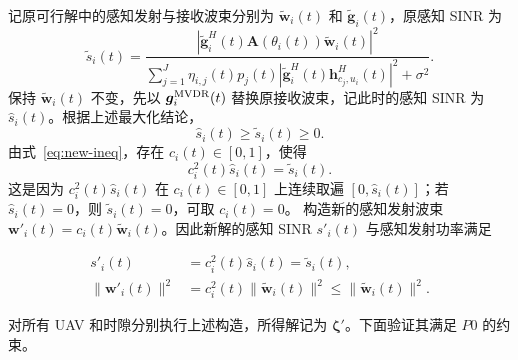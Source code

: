 \documentclass[11pt,a4paper]{ctexart}
\begin{document}
记原可行解中的感知发射与接收波束分别为 $\tilde{\bm w}_i(t)$ 和 $\tilde{\bm g}_i(t)$，原感知 SINR 为
\begin{equation}\label{eq:new-old-sinr}
\tilde s_i(t)=\frac{\left|\tilde{\bm g}_i^H(t)\mathbf A(\theta_i(t))\tilde{\bm w}_i(t)\right|^2}{\displaystyle\sum_{j=1}^{J}\eta_{i,j}(t)p_j(t)\left|\tilde{\bm g}_i^H(t)\bm h_{c_j,u_i}^{H}(t)\right|^2+\sigma^2}.
\end{equation}
保持 $\tilde{\bm w}_i(t)$ 不变，先以 $\bm g_i^{\rm MVDR}(t)$ 替换原接收波束，记此时的感知 SINR 为 $\hat s_i(t)$。根据上述最大化结论，
\begin{equation}\label{eq:new-ineq}
\hat s_i(t)\ge\tilde s_i(t)\ge0.
\end{equation}
由式~\eqref{eq:new-ineq}，存在 $c_i(t)\in[0,1]$，使得
\begin{equation}\label{eq:new-scale}
c_i^2(t)\hat s_i(t)=\tilde s_i(t).
\end{equation}
这是因为 $c_i^2(t)\hat s_i(t)$ 在 $c_i(t)\in[0,1]$ 上连续取遍 $[0,\hat s_i(t)]$；若 $\hat s_i(t)=0$，则 $\tilde s_i(t)=0$，可取 $c_i(t)=0$。
构造新的感知发射波束 $\bm w'_i(t)=c_i(t)\tilde{\bm w}_i(t)$。因此新解的感知 SINR $s'_i(t)$ 与感知发射功率满足
\begin{samepage}
\begin{align}\label{eq:new-same-sinr}
s'_i(t)&=c_i^2(t)\hat s_i(t)=\tilde s_i(t),\\
\|\bm w'_i(t)\|^2&=c_i^2(t)\|\tilde{\bm w}_i(t)\|^2\le\|\tilde{\bm w}_i(t)\|^2.\label{eq:new-power}
\end{align}
\end{samepage}
对所有 UAV 和时隙分别执行上述构造，所得解记为 $\bm\zeta'$。下面验证其满足 $P0$ 的约束。
\end{document}
